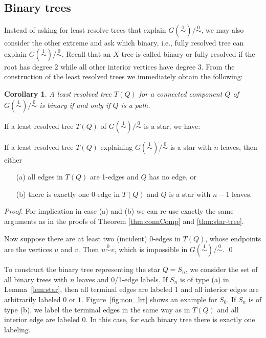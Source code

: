 \documentclass[smallextended]{svjour3}
\newcommand{\Ro}{\mathrel{\overset{0}{\sim}}}
\newcommand{\Rl}{\mathrel{\overset{1}{\sim}}}
\newtheorem{cor}[thm]{Corollary}
\begin{document}
\subsection*{Binary trees}

Instead of asking for least resolve trees that explain $G(\Rl)/\Ro$, we may
also consider the other extreme and ask which binary, i.e., fully resolved
tree can explain $G(\Rl)/\Ro$. Recall that an $X$-tree is called binary or
fully resolved if the root has degree $2$ while all other interior vertices
have degree $3$.  From the construction of the least resolved trees we
immediately obtain the following:
\begin{cor}
  A least resolved tree $T(Q)$ for a connected component $Q$ of
  $G(\Rl)/\Ro$ is binary if and only if $Q$ is a path.
\end{cor}

If a least resolved tree $T(Q)$ of $G(\Rl)/\Ro$ is a star, we have:
\begin{lemma}\label{lem:star}
  If a least resolved tree $T(Q)$ explaining $G(\Rl)/\Ro$ is a star
  with $n$ leaves, then either
  \begin{itemize}
    \item[(a)] all edges in $T(Q)$ are 1-edges and $Q$ has no edge, or 
    \item[(b)] there is exactly one 0-edge in $T(Q)$ and $Q$ is a star
        with $n-1$ leaves.
    \end{itemize}
  \end{lemma}
\begin{proof}
  For implication in case (a) and (b) we can re-use exactly the same
  arguments as in the proofs of Theorem \ref{thm:connComp} and
  \ref{thm:star-tree}.

  Now suppose there are at least two (incident) 0-edges in $T(Q)$, whose
  endpoints are the vertices $u$ and $v$. Then $u\Ro v$, which is
  impossible in $G(\Rl)/\Ro$.  \qed
\end{proof}

To construct the binary tree representing the star $Q=S_n$, we consider the
set of all binary trees with $n$ leaves and 0/1-edge labels. If $S_n$ is of
type (a) in Lemma~\ref{lem:star}, then all terminal edges are labeled $1$
and all interior edges are arbitrarily labeled $0$ or $1$.
Figure~\ref{fig:non_lrt} shows an example for $S_6$.  If $S_n$ is of type
(b), we label the terminal edges in the same way as in $T(Q)$ and all
interior edge are labeled 0. In this case, for each binary tree there is
exactly one labeling.
\end{document}
